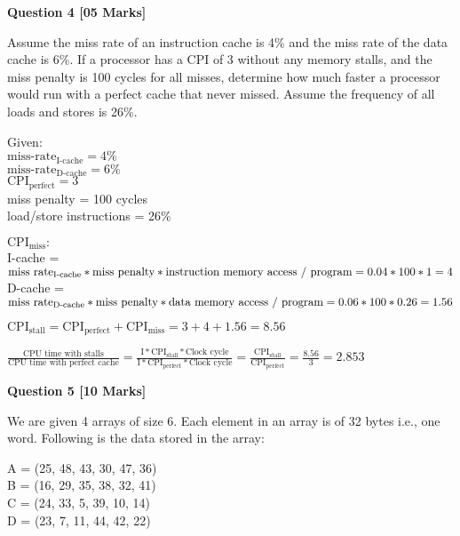\documentclass[addpoints]{exam}
\begin{document}
\begin{sloppypar}
\begin{questions}
    \question[05]
    \begin{center}
        \textbf{Question 4 [05 Marks]}
    \end{center}
    Assume the miss rate of an instruction cache is 4\% and the miss rate of the data cache is 6\%. If a processor has a CPI of 3 without any memory stalls, and the miss penalty is 100 cycles for all misses, determine how much faster a processor would run with a perfect cache that never missed. Assume the frequency of all loads and stores is 26\%.
    \begin{solution}

        Given:\\
        $\text{miss-rate}_\text{I-cache} = 4\% $\\
        $\text{miss-rate}_\text{D-cache} = 6\% $\\
        $\text{CPI}_\text{perfect} = 3 $\\
        miss penalty = 100 cycles \\
        load/store instructions = 26\%

        $\text{CPI}_{\text{miss}} :$ \\
        I-cache = $ \text{miss rate}_{\text{I-cache}} * \text{miss penalty} * \text{instruction memory access / program} \\
        = 0.04*100*1 = 4$ \\
        D-cache = $ \text{miss rate}_{\text{D-cache}} * \text{miss penalty} * \text{data memory access / program} \\
        = 0.06*100*0.26 = 1.56$

        $\text{CPI}_{\text{stall}} = \text{CPI}_{\text{perfect}} + \text{CPI}_{\text{miss}} = 3 + 4 + 1.56 = 8.56$

        $\displaystyle\frac{\text{CPU time with stalls}}{\text{CPU time with perfect cache}}=\displaystyle\frac{\text{I}*\text{CPI}_{\text{stall}}*\text{Clock cycle}}{\text{I}*\text{CPI}_{\text{perfect}}*\text{Clock cycle}}=\displaystyle\frac{\text{CPI}_{\text{stall}}}{\text{CPI}_{\text{perfect}}}=\displaystyle\frac{8.56}{3}=2.853$
    \end{solution}
    \pagebreak
    \question[10]
    \begin{center}
        \textbf{Question 5 [10 Marks]}
    \end{center}
    We are given 4 arrays of size 6. Each element in an array is of 32 bytes i.e., one word. Following is the data stored in the array:

    A = (25, 48, 43, 30, 47, 36) \\ B = (16, 29, 35, 38, 32, 41) \\ C = (24, 33, 5, 39, 10, 14) \\ D = (23, 7, 11, 44, 42, 22)


\end{questions}
\end{sloppypar}
\end{document}
